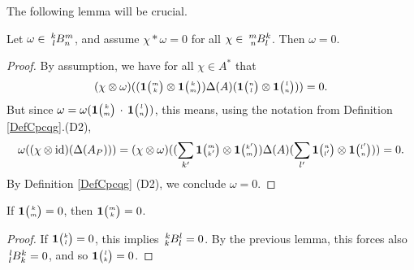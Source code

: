 The following lemma will be crucial.

\begin{Lem}\label{LemRefSep} Let $\omega \in \Gr{B}{k}{m}{l}{n}$, and assume $\chi*\omega =  0$ for all $\chi \in \Gr{B}{m}{k}{n}{l}$. Then $\omega =0$.
\end{Lem} 
\begin{proof} By assumption, we have for all $\chi\in A^*$ that \[(\chi\otimes \omega)((\UnitC{m}{k}\otimes \UnitC{k}{m})\Delta(A)(\UnitC{n}{l}\otimes \UnitC{l}{n}))=0.\] But since $\omega = \omega(\UnitC{k}{m}\,\cdot\,\UnitC{l}{n})$, this means, using the notation from Definition \ref{DefCpcqg}.(D2), \[\omega((\chi\otimes \id)(\Delta(A_P))) =(\chi\otimes \omega)((\sum_{k'}\UnitC{m}{k'}\otimes \UnitC{k'}{m})\Delta(A)(\sum_{l'}\UnitC{n}{l'}\otimes \UnitC{l'}{n})) =0.\] By Definition \ref{DefCpcqg} (D2), we conclude $\omega=0$.
\end{proof} 

\begin{Cor} If $\UnitC{k}{m}=0$, then $\UnitC{m}{k}=0$. 
\end{Cor}
\begin{proof} If $\UnitC{k}{l}=0$, this implies $\Gr{B}{k}{l}{k}{l}=0$. By the previous lemma, this forces also $\Gr{B}{l}{k}{l}{k}=0$, and so $\UnitC{l}{k}=0$. 
\end{proof} 

